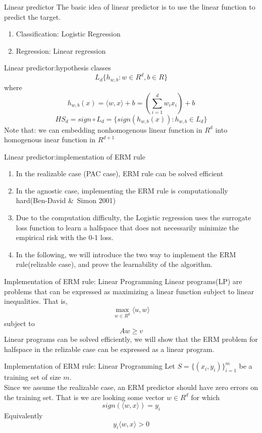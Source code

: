 \documentclass{beamer}
\begin{document}
\begin{frame}{Linear predictor}
	The basic idea of linear predictor is to use the linear function to predict the target.
	\begin{enumerate}
			\item Classification: Logistic Regression
			\item Regression: Linear regression
	\end{enumerate}
\end{frame}
\begin{frame}{Linear predictor:hypothesis classes}
	\[L_d\{h_{w,b}: w \in R^d,b \in R\}\]
	where
	\[h_{w,b}(x) = \langle w,x \rangle +b = (\sum^d_{i=1} w_i x_i) + b\]
	\[HS_d = sign \circ L_d = \{sign(h_{w,b}(x)):h_{w,b} \in L_d\}\]
	Note that: we can embedding nonhomogenous linear function in $R^d$ into homogenous inear function in $R^{d+1}$
\end{frame}
\begin{frame}{Linear predictor:implementation of ERM rule}
	\begin{enumerate}
		\item In the realizable case (PAC case), ERM rule can be solved efficient
		\item In the agnostic case, implementing the ERM rule is computationally hard(Ben-David \&\ Simon 2001)
		\item Due to the computation difficulty, the Logistic regression uses the surrogate loss function to learn a halfspace that does not necessarily minimize the empirical risk with the 0-1 loss. 
		\item In the following, we will introduce the two way to implement the ERM rule(relizable case), and prove the learnability of the algorithm.
	\end{enumerate}
\end{frame}
\begin{frame}{Implementation of ERM rule: Linear Programming}
	Linear programs(LP) are problems that can be expressed as maximizing a linear function subject to linear inequalities. That is,
	\[\max_{w \in R^d} \langle u,w \rangle \]
	subject to
	\[Aw \geq v\]
	Linear programs can be solved efficiently, we will show that the ERM problem for halfspace in the relizable case can be expressed as a linear program.
\end{frame}
\begin{frame}{Implementation of ERM rule: Linear Programming}
	Let $S = \{(x_i,y_i)\}^m_{i=1}$ be a training set of size $m$. \\
	Since we assume the realizable case, an ERM predictor should have zero errors on the training set. That is we are looking some vector $w \in R^d$ for which
	\[sign(\langle w,x \rangle) = y_i\]
	Equivalently
	\[y_i \langle w,x \rangle > 0\]
\end{frame}
\end{document}
